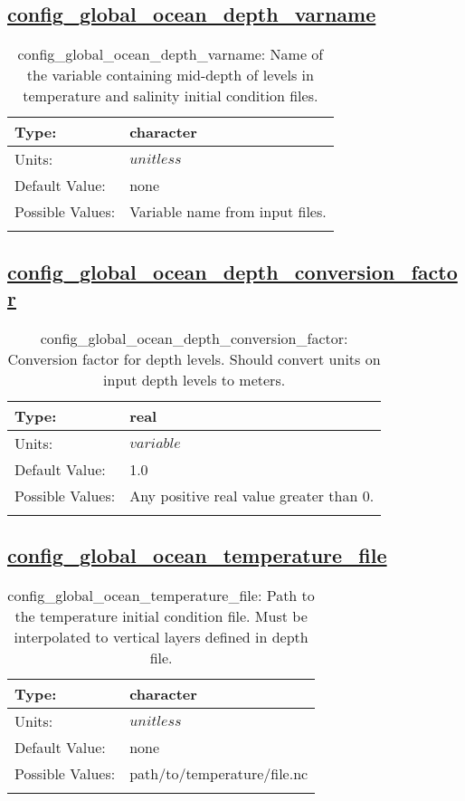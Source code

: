 \subsection[config\_global\_ocean\_depth\_varname]{\hyperref[sec:nm_tab_global_ocean]{config\_global\_ocean\_depth\_varname}}
\label{subsec:nm_sec_config_global_ocean_depth_varname}
\begin{center}
\begin{longtable}{| p{2.0in} || p{4.0in} |}
    \hline
    Type: & character \\
    \hline
    Units: & $unitless$ \\
    \hline
    Default Value: & none \\
    \hline
    Possible Values: & Variable name from input files. \\
    \hline
    \caption{config\_global\_ocean\_depth\_varname: Name of the variable containing mid-depth of levels in temperature and salinity initial condition files.}
\end{longtable}
\end{center}
\subsection[config\_global\_ocean\_depth\_conversion\_factor]{\hyperref[sec:nm_tab_global_ocean]{config\_global\_ocean\_depth\_conversion\_factor}}
\label{subsec:nm_sec_config_global_ocean_depth_conversion_factor}
\begin{center}
\begin{longtable}{| p{2.0in} || p{4.0in} |}
    \hline
    Type: & real \\
    \hline
    Units: & $variable$ \\
    \hline
    Default Value: & 1.0 \\
    \hline
    Possible Values: & Any positive real value greater than 0. \\
    \hline
    \caption{config\_global\_ocean\_depth\_conversion\_factor: Conversion factor for depth levels. Should convert units on input depth levels to meters.}
\end{longtable}
\end{center}
\subsection[config\_global\_ocean\_temperature\_file]{\hyperref[sec:nm_tab_global_ocean]{config\_global\_ocean\_temperature\_file}}
\label{subsec:nm_sec_config_global_ocean_temperature_file}
\begin{center}
\begin{longtable}{| p{2.0in} || p{4.0in} |}
    \hline
    Type: & character \\
    \hline
    Units: & $unitless$ \\
    \hline
    Default Value: & none \\
    \hline
    Possible Values: & path/to/temperature/file.nc \\
    \hline
    \caption{config\_global\_ocean\_temperature\_file: Path to the temperature initial condition file. Must be interpolated to vertical layers defined in depth file.}
\end{longtable}
\end{center}
